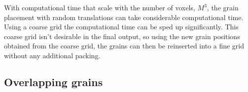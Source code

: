 \documentclass[3p,12pt]{elsarticle}
\newcommand{\Co}{\mathrm{Co}}
\begin{document}

With computational time that scale with the number of voxels, $M^3$, the grain placement with random translations can take considerable computational time.
Using a coarse grid the computational time can be sped up significantly.
This coarse grid isn't desirable in the final output, so using the new grain positions obtained from the coarse grid, the grains can then be reinserted into a fine grid without any additional packing.

\subsection{Overlapping grains}\label{sec:overlapping_grains}
\end{document}

